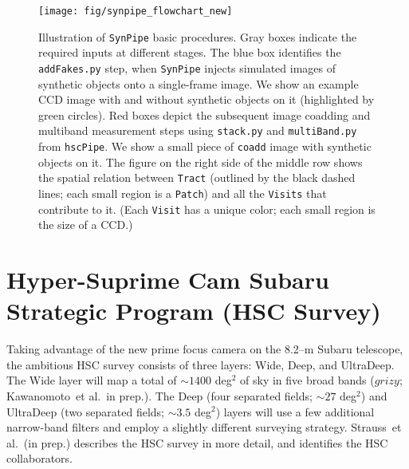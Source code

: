 \documentclass[useamsfonts]{pasj01}
\def\etal{{\ et al.~}}
\def\hscpipe{\texttt{hscPipe}}
\def\synpipe{\texttt{SynPipe}}
\def\coadd{\texttt{coadd}}
\def\tract{\texttt{Tract}}
\def\visit{\texttt{Visit}}
\def\visits{\texttt{Visits}}
\begin{document}
\begin{figure}
    \begin{center}
        \texttt{[image: fig/synpipe\_flowchart\_new]}
    \end{center}
    \caption{
        Illustration of \synpipe{} basic procedures.
        Gray boxes indicate the required inputs at different stages.
        The blue box identifies the \texttt{addFakes.py} step, when \synpipe{} injects 
        simulated images of synthetic objects onto a single-frame image. 
        We show an example CCD image with and without synthetic objects on it
        (highlighted by green circles).
        Red boxes depict the subsequent image coadding and multiband measurement steps
        using \texttt{stack.py} and \texttt{multiBand.py} from \hscpipe{}.
        We show a small piece of \coadd{} image with synthetic objects on it.
        The figure on the right side of the middle row shows the spatial relation
        between \tract{} (outlined by the black dashed lines; each small region
        is a \texttt{Patch}) and all the \visits{} that contribute to it. 
        (Each \visit{} has a  unique color; each small region is the size of a CCD.)
        }
    \label{fig:flowchart}
\end{figure}

\section{Hyper-Suprime Cam Subaru Strategic Program (HSC Survey)}
    \label{sec:ssp}

    Taking advantage of the new prime focus camera on the 8.2--m Subaru telescope,
    the ambitious HSC survey consists of three layers: Wide, Deep, and UltraDeep.
    The Wide layer will map a total of ${\sim}1400$ deg$^2$ of sky in five broad bands
    ($grizy$; Kawanomoto\etal in prep.).
    The Deep (four separated fields; ${\sim}27$ deg$^2$) and UltraDeep (two separated
    fields; ${\sim}3.5$ deg$^2$) layers will use a few additional narrow-band filters
    and employ a slightly different surveying strategy.
    Strauss\etal (in prep.) describes the HSC survey in more detail, and identifies the 
    HSC collaborators.
\end{document}
